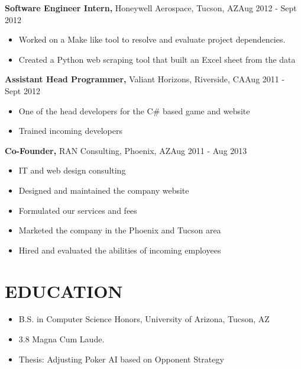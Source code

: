 \documentclass{res}
\begin{document}
\begin{resume}
  {\bf Software Engineer Intern,} Honeywell Aerospace, Tucson, AZ\hfill Aug 2012 - Sept 2012
  \begin{itemize} \itemsep -2pt %
    \item Worked on a Make like tool to resolve and evaluate project dependencies.
    \item Created a Python web scraping tool that built an Excel sheet from the data
  \end{itemize}

  {\bf Assistant Head Programmer,} Valiant Horizons, Riverside, CA\hfill Aug 2011 - Sept 2012
  \begin{itemize} \itemsep -2pt %
    \item One of the head developers for the C\# based game and website
    \item Trained incoming developers
  \end{itemize}

  {\bf Co-Founder,} RAN Consulting, Phoenix, AZ\hfill Aug 2011 - Aug 2013
  \begin{itemize} \itemsep -2pt %
    \item IT and web design consulting
    \item Designed and maintained the company website
    \item Formulated our services and fees
    \item Marketed the company in the Phoenix and Tucson area
    \item Hired and evaluated the abilities of incoming employees
  \end{itemize}

\section{EDUCATION} 
  \begin{itemize} \itemsep -2pt %
    \item B.S. in Computer Science Honors, University of Arizona, Tucson, AZ
    \item 3.8 Magna Cum Laude. 
    \item Thesis: Adjusting Poker AI based on Opponent Strategy
  \end{itemize}


\end{resume}
\end{document}
